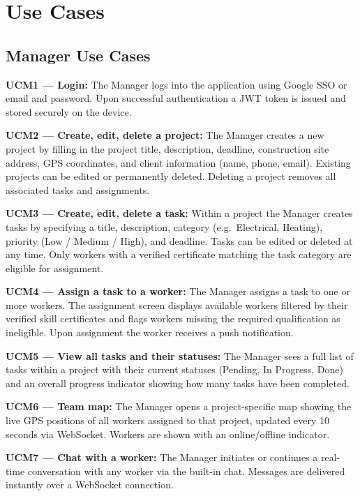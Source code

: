 \documentclass[12pt,a4paper]{article}
\begin{document}
\section{Use Cases}

\subsection{Manager Use Cases}

\textbf{UCM1 --- Login:} The Manager logs into the application using Google SSO or email and password. Upon successful authentication a JWT token is issued and stored securely on the device.

\textbf{UCM2 --- Create, edit, delete a project:} The Manager creates a new project by filling in the project title, description, deadline, construction site address, GPS coordinates, and client information (name, phone, email). Existing projects can be edited or permanently deleted. Deleting a project removes all associated tasks and assignments.

\textbf{UCM3 --- Create, edit, delete a task:} Within a project the Manager creates tasks by specifying a title, description, category (e.g.\ Electrical, Heating), priority (Low / Medium / High), and deadline. Tasks can be edited or deleted at any time. Only workers with a verified certificate matching the task category are eligible for assignment.

\textbf{UCM4 --- Assign a task to a worker:} The Manager assigns a task to one or more workers. The assignment screen displays available workers filtered by their verified skill certificates and flags workers missing the required qualification as ineligible. Upon assignment the worker receives a push notification.

\textbf{UCM5 --- View all tasks and their statuses:} The Manager sees a full list of tasks within a project with their current statuses (Pending, In Progress, Done) and an overall progress indicator showing how many tasks have been completed.

\textbf{UCM6 --- Team map:} The Manager opens a project-specific map showing the live GPS positions of all workers assigned to that project, updated every 10 seconds via WebSocket. Workers are shown with an online/offline indicator.

\textbf{UCM7 --- Chat with a worker:} The Manager initiates or continues a real-time conversation with any worker via the built-in chat. Messages are delivered instantly over a WebSocket connection.
\end{document}
